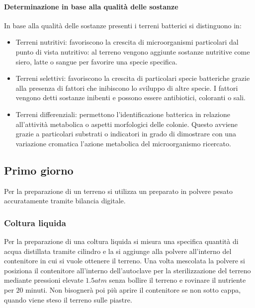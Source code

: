 			\paragraph{Determinazione in base alla qualit\`a delle sostanze}
			In base alla qualit\`a delle sostanze presenti i terreni batterici si distinguono in:
			\begin{itemize}
				\item Terreni nutritivi: favoriscono la crescita di microorganismi particolari dal punto di vista nutritivo:
					al terreno vengono aggiunte sostanze nutritive come siero, latte o sangue per favorire una specie specifica.
				\item Terreni selettivi: favoriscono la crescita di particolari specie batteriche grazie alla presenza di fattori che inibiscono lo sviluppo di altre specie.
					I fattori vengono detti sostanze inibenti e possono essere antibiotici, coloranti o sali.
				\item Terreni differenziali: permettono l'identificazione batterica in relazione all'attivit\`a metabolica o aspetti morfologici delle colonie.
					Questo avviene grazie a particolari substrati o indicatori in grado di dimostrare con una variazione cromatica l'azione metabolica del microorganismo ricercato.
			\end{itemize}
	\subsection{Primo giorno}
	Per la preparazione di un terreno si utilizza un preparato in polvere pesato accuratamente tramite bilancia digitale.

		\subsubsection{Coltura liquida}
		Per la preparazione di una coltura liquida si misura una specifica quantit\`a di acqua distillata tramite cilindro e la si aggiunge alla polvere all'interno del contenitore in cui si vuole ottenere il terreno.
		Una volta mescolata la polvere si posiziona il contenitore all'interno dell'autoclave per la sterilizzazione del terreno mediante pressioni elevate $1.5\si{atm}$ senza bollire il terreno e rovinare il nutriente per $20$ minuti.
		Non bisogner\`a poi pi\`u aprire il contenitore se non sotto cappa, quando viene steso il terreno sulle piastre.

